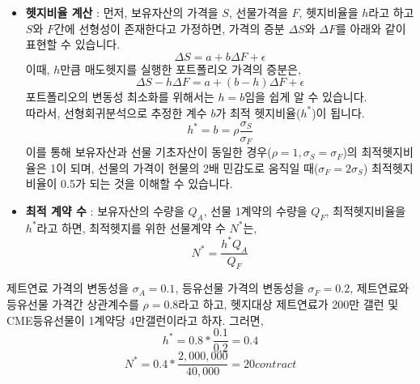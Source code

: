 \documentclass[
  letterpaper,
  DIV=11,
  numbers=noendperiod]{scrreprt}
\begin{document}
\begin{itemize}
\item
  \textbf{헷지비율 계산} : 먼저, 보유자산의 가격을 \(S\), 선물가격을
  \(F\), 헷지비율을 \(h\)라고 하고 \(S\)와 \(F\)간에 선형성이 존재한다고
  가정하면, 가격의 증분 \(\Delta S\)와 \(\Delta F\)를 아래와 같이 표현할
  수 있습니다. \[\Delta S=a+b\Delta F+\epsilon\] 이때, \(h\)만큼
  매도헷지를 실행한 포트폴리오 가격의 증분은,
  \[\Delta S-h\Delta F=a+(b-h)\Delta F+\epsilon\] 포트폴리오의 변동성
  최소화를 위해서는 \(h=b\)임을 쉽게 알 수 있습니다.\\
  따라서, 선형회귀분석으로 추정한 계수 \(b\)가 최적 헷지비율(\(h^*\))이
  됩니다. \[h^*=b=\rho \frac{\sigma _S}{\sigma _F}\] 이를 통해
  보유자산과 선물 기초자산이 동일한
  경우(\(\rho=1, \sigma _S=\sigma _F\))의 최적헷지비율은 1이 되며,
  선물의 가격이 현물의 2배 민감도로 움직일 때(\(\sigma _F=2\sigma _S\))
  최적헷지비율이 0.5가 되는 것을 이해할 수 있습니다.
\item
  \textbf{최적 계약 수} : 보유자산의 수량을 \(Q_A\), 선물 1계약의 수량을
  \(Q_F\), 최적헷지비율을 \(h^*\)라고 하면, 최적헷지를 위한 선물계약 수
  \(N^*\)는, \[N^*=\frac{h^* Q_A}{Q_F}\]
\end{itemize}

\begin{tcolorbox}[enhanced jigsaw, toprule=.15mm, breakable, left=2mm, leftrule=.75mm, opacitybacktitle=0.6, coltitle=black, rightrule=.15mm, colback=white, titlerule=0mm, bottomtitle=1mm, colframe=quarto-callout-note-color-frame, title=\textcolor{quarto-callout-note-color}{\faInfo}\hspace{0.5em}{최적헷지비율 및 계약수 예시}, toptitle=1mm, arc=.35mm, colbacktitle=quarto-callout-note-color!10!white, opacityback=0, bottomrule=.15mm]

제트연료 가격의 변동성을 \(\sigma _A=0.1\), 등유선물 가격의 변동성을
\(\sigma _F=0.2\), 제트연료와 등유선물 가격간 상관계수를
\(\rho = 0.8\)라고 하고, 헷지대상 제트연료가 200만 갤런 및 CME등유선물이
1계약당 4만갤런이라고 하자. 그러면, \[h^*=0.8*\frac{0.1}{0.2}=0.4\]
\[N^*=0.4*\frac{2,000,000}{40,000}=20contract\]

\end{tcolorbox}
\end{document}
